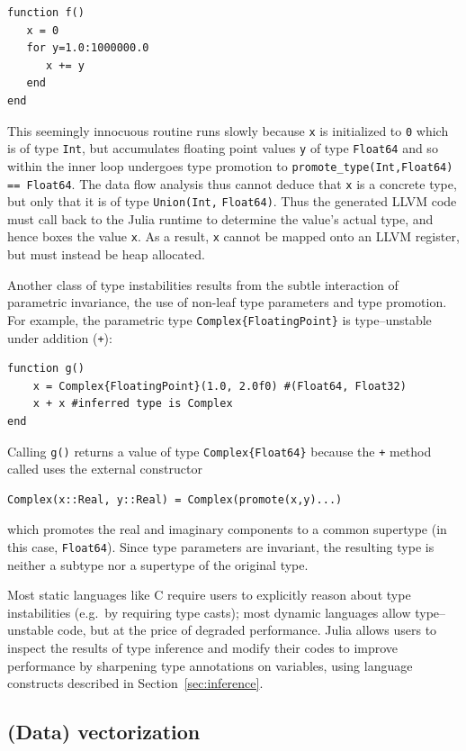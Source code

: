 \documentclass[pldi]{sigplanconf-pldi15}
\begin{document}
\begin{lstlisting}
function f()
   x = 0
   for y=1.0:1000000.0
      x += y
   end
end
\end{lstlisting}
%
This seemingly innocuous routine runs slowly because \verb|x| is initialized to
\verb|0| which is of type \verb|Int|, but accumulates floating point values
\verb|y| of type \verb|Float64| and so within the inner loop undergoes type
promotion to \verb|promote_type(Int,Float64)| \verb|== Float64|. The data flow
analysis thus cannot deduce that \verb|x| is a concrete type, but only that it
is of type \verb|Union(Int,| \verb|Float64)|. Thus the generated LLVM code must
call back to the Julia runtime to determine the value's actual type, and hence
boxes the value \verb|x|. As a result, \verb|x| cannot be mapped onto an LLVM
register, but must instead be heap allocated.

Another class of type instabilities results from the subtle interaction of
parametric invariance, the use of non-leaf type parameters and type promotion.
For example, the parametric type \verb|Complex{FloatingPoint}| is
type--unstable under addition (\verb|+|):

\begin{lstlisting}
function g()
    x = Complex{FloatingPoint}(1.0, 2.0f0) #(Float64, Float32)
    x + x #inferred type is Complex
end
\end{lstlisting}
%
Calling \verb|g()| returns a value of type \verb|Complex{Float64}| because the
\verb|+| method called uses the external constructor

\begin{lstlisting}
Complex(x::Real, y::Real) = Complex(promote(x,y)...)
\end{lstlisting}
%
which promotes the real and imaginary components to a common supertype (in this
case, \verb|Float64|). Since type parameters are invariant, the resulting type
is neither a subtype nor a supertype of the original type.

Most static languages like C require users to explicitly reason about type
instabilities (e.g.\ by requiring type casts); most dynamic languages allow
type--unstable code, but at the price of degraded performance. Julia allows
users to inspect the results of type inference and modify their codes to
improve performance by sharpening type annotations on variables, using language
constructs described in Section~\ref{sec:inference}.


\subsection{(Data) vectorization}
\end{document}
